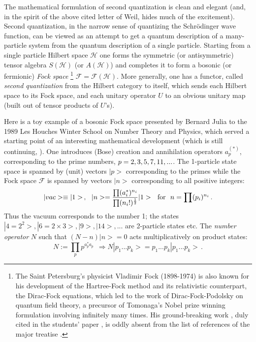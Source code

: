 \documentclass[12pt]{article}
\begin{document}
The mathematical formulation of second quantization is clean and elegant (and, 
in the spirit of the above cited letter of Weil, hides much of the excitement).
 Second quantization, in the narrow sense of quantizing the Schr\"odinger wave 
function, can be viewed as an attempt to get a quantum description of a 
many-particle system from the quantum description of a single particle. Starting
 from a single particle Hilbert space $\mathcal{H}$ one forms the symmetric (or
 antisymmetric) tensor algebra $S(\mathcal{H})$ (or $A(\mathcal{H})$) and 
completes it to form a bosonic (or fermionic) {\it Fock space} \footnote{The 
Saint Petersburg's physicist Vladimir Fock (1898-1974) is also known for his 
development of the Hartree-Fock method and its relativistic counterpart, the 
Dirac-Fock equations, which led to the work of Dirac-Fock-Podolsky on quantum 
field theory, a precursor of Tomonaga's Nobel prize winning formulation 
involving infinitely many times. His ground-breaking work \cite{F32}, duly cited
 in the students' paper \cite{CF09}, is oddly absent from the list of references
 of the major treatise \cite{Sch}.} $\mathcal{F} = \mathcal{F}(\mathcal{H})$. 
More generally, one has a functor, called {\it second quantization} from the
Hilbert category to itself, which sends each Hilbert space to its Fock space, 
and each unitary operator $U$ to an obvious
unitary map (built out of tensor products of $U$'s).

Here is a toy example of a bosonic Fock space presented by Bernard Julia to the 1989 Les Houches Winter School on
Number Theory and Physics, which served a starting point of an interesting
mathematical development \cite{BC} (which is still continuing, \cite{CC}).
One introduces (Bose) creation and annihilation operators $a_p^{(*)}$, corresponding to the prime numbers, $p=2, 3, 5, \\
 7, 11, ...$. The 1-particle state space is spanned by (unit) vectors $|p>$ corresponding to the primes while the Fock 
space $\mathcal{F}$ is spanned by vectors $|n>$ corresponding to all positive integers:
\begin{equation}
\label{JBC}
|vac>\equiv |1>\,, \ \ |n> = \frac{\prod(a_i^*)^{n_i}}{\prod(n_i!)^{\frac{1}{2}}}
|1> \ \ {\rm for} \ \ n = \prod (p_i)^{n_i}\,.
\end{equation}
Thus the vacuum corresponds to the number 1; the states $|4=2^2>, |6=2\times 3>, |9>, |14>, ...$ are 2-particle states etc.
The {\it number operator} $N$ such that $(N-n)|n> = 0$ acts multiplicatively on product states:
\begin{equation}
\label{N}
N:= \prod_p p^{a^*_p a_p} \ \ \Rightarrow N|p_1...p_k> = p_1...p_k |p_1...p_k>\,.
\end{equation}
\end{document}
